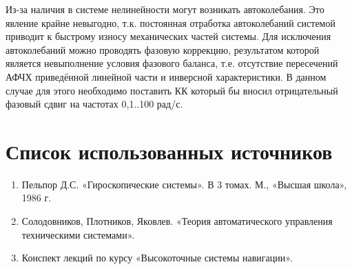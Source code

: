 \documentclass[main.tex]{subfiles}
\begin{document}
Из-за наличия в системе нелинейности могут возникать автоколебания. Это явление крайне
невыгодно, т.к. постоянная отработка автоколебаний системой приводит к быстрому износу
механических частей системы. Для исключения автоколебаний можно проводять фазовую коррекцию,
результатом которой является невыполнение условия фазового баланса, т.е. отсутствие
пересечений АФЧХ приведённой линейной части и инверсной характеристики. В данном случае для этого необходимо поставить КК который бы вносил 
отрицательный фазовый сдвиг на частотах 0,1..100 рад/с.

\newpage
\section*{Список использованных источников}
\begin{enumerate}
    \item Пельпор Д.С. «Гироскопические системы». В 3 томах. М., «Высшая школа», 1986 г.
    \item Солодовников, Плотников, Яковлев. «Теория автоматического управления
    техническими системами».
    \item Конспект лекций по курсу «Высокоточные системы навигации».
\end{enumerate}
\end{document}
